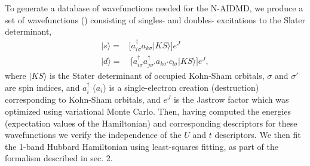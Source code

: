 To generate a database of wavefunctions needed for the N-AIDMD, 
we produce a set of wavefunctions () consisting of singles- and doubles- excitations 
to the Slater determinant, 
\begin{subequations}
\begin{eqnarray}
| s \rangle = & \Big[a^\dagger_{i \sigma} a_{k \sigma}   | KS \rangle \Big]e^J \\
| d \rangle = & \: \Big[a^\dagger_{i \sigma} a^\dagger_{j \sigma'} a_{k \sigma'} c_{l \sigma}   | KS \rangle\Big]e^J ,
\end{eqnarray}
\end{subequations}
where $|KS\rangle$ is the Stater determinant of occupied Kohn-Sham orbitals, $\sigma$ and $\sigma'$ are spin indices, 
and $a_{i}^\dagger$ ($a_{i}$) is a single-electron creation (destruction) corresponding to Kohn-Sham orbitals, 
and $e^J$ is the Jastrow factor which was optimized using variational Monte Carlo. 
Then, having computed the energies (expectation values of the Hamiltonian) and corresponding 
descriptors for these wavefunctions we verify the independence of the $U$ and $t$ descriptors.
We then fit the 1-band Hubbard Hamiltonian using least-squares fitting, as part of the formalism described in sec. 2. 

